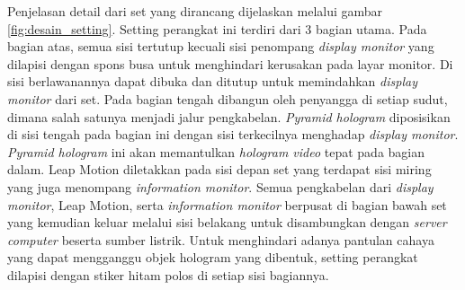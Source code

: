 		Penjelasan detail dari set yang dirancang dijelaskan melalui gambar \ref{fig:desain_setting}. Setting perangkat ini terdiri dari 3 bagian utama. Pada bagian atas, semua sisi tertutup kecuali sisi penompang \textit{display monitor} yang dilapisi dengan spons busa untuk menghindari kerusakan pada layar monitor. Di sisi berlawanannya dapat dibuka dan ditutup untuk memindahkan \textit{display monitor} dari set. Pada bagian tengah dibangun oleh penyangga di setiap sudut, dimana salah satunya menjadi jalur pengkabelan. \textit{Pyramid hologram} diposisikan di sisi tengah pada bagian ini dengan sisi terkecilnya menghadap \textit{display monitor}. \textit{Pyramid hologram} ini akan memantulkan \textit{hologram video} tepat pada bagian dalam. Leap Motion diletakkan pada sisi depan set yang terdapat sisi miring yang juga menompang \textit{information monitor}. Semua pengkabelan dari \textit{display monitor}, Leap Motion, serta \textit{information monitor} berpusat di bagian bawah set yang kemudian keluar melalui sisi belakang untuk disambungkan dengan \textit{server computer} beserta sumber listrik. Untuk menghindari adanya pantulan cahaya yang dapat mengganggu objek hologram yang dibentuk, setting perangkat dilapisi dengan stiker hitam polos di setiap sisi bagiannya.
	\vspace{1ex}
	
